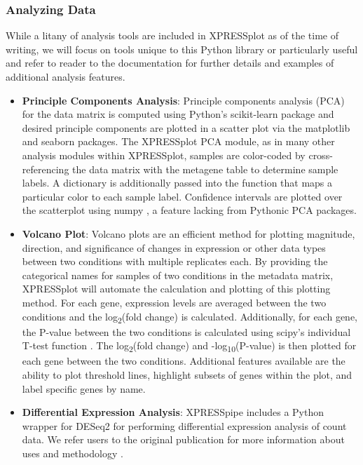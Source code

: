 \documentclass[11pt, a4paper, oneside]{article}
\begin{document}
\subsubsection{Analyzing Data}

While a litany of analysis tools are included in XPRESSplot as of the time of writing, we will focus on tools unique to this Python library or particularly useful and refer to reader to the documentation for further details and examples of additional analysis features.

\begin{itemize}
  \item \textbf{Principle Components Analysis}: Principle components analysis (PCA) for the data matrix is computed using Python's scikit-learn package \cite{scikit_learn} and desired principle components are plotted in a scatter plot via the matplotlib \cite{matplotlib} and seaborn \cite{seaborn} packages. The XPRESSplot PCA module, as in many other analysis modules within XPRESSplot, samples are color-coded by cross-referencing the data matrix with the metagene table to determine sample labels. A dictionary is additionally passed into the function that maps a particular color to each sample label. Confidence intervals are plotted over the scatterplot using numpy \cite{numpy1, numpy2}, a feature lacking from Pythonic PCA packages.

  \item \textbf{Volcano Plot}: Volcano plots are an efficient method for plotting magnitude, direction, and significance of changes in expression or other data types between two conditions with multiple replicates each. By providing the categorical names for samples of two conditions in the metadata matrix, XPRESSplot will automate the calculation and plotting of this plotting method. For each gene, expression levels are averaged between the two conditions and the log\textsubscript{2}(fold change) is calculated. Additionally, for each gene, the P-value between the two conditions is calculated using scipy's individual T-test function \cite{scipy}. The log\textsubscript{2}(fold change) and -log\textsubscript{10}(P-value) is then plotted for each gene between the two conditions. Additional features available are the ability to plot threshold lines, highlight subsets of genes within the plot, and label specific genes by name.

  \item \textbf{Differential Expression Analysis}: XPRESSpipe includes a Python wrapper for DESeq2 for performing differential expression analysis of count data. We refer users to the original publication for more information about uses and methodology \cite{deseq2}.

\end{itemize}
\end{document}
